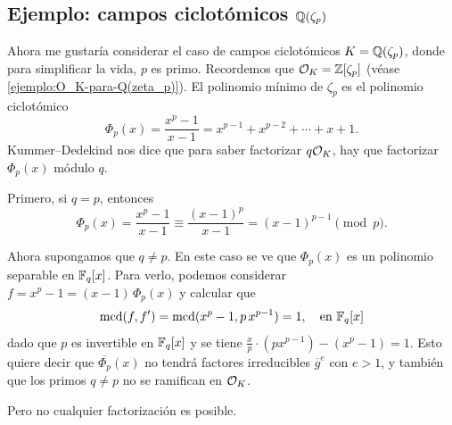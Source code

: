 \subsection{Ejemplo: campos ciclotómicos $\mathbb{Q} (\zeta_p)$}

Ahora me gustaría considerar el caso de campos ciclotómicos $K = \mathbb{Q} (\zeta_p)$,
donde para simplificar la vida, $p$ es primo. Recordemos que
$\mathcal{O}_K = \mathbb{Z} [\zeta_p]$ (véase \ref{ejemplo:O_K-para-Q(zeta_p)}). El polinomio
mínimo de $\zeta_p$ es el polinomio ciclotómico
$$\Phi_p (x) = \frac{x^p - 1}{x-1} = x^{p-1} + x^{p-2} + \cdots + x + 1.$$
Kummer--Dedekind nos dice que para saber factorizar $q\mathcal{O}_K$, hay que
factorizar $\Phi_p (x)$ módulo $q$.

Primero, si $q = p$, entonces
\[ \Phi_p (x) = \frac{x^p - 1}{x-1} \equiv \frac{(x - 1)^p}{x-1} =
   (x-1)^{p-1} \pmod{p}. \]

Ahora supongamos que $q \ne p$. En este caso se ve que $\Phi_p (x)$ es un
polinomio separable en $\mathbb{F}_q [x]$. Para verlo, podemos considerar
$f = x^p - 1 = (x-1)\,\Phi_p (x)$ y calcular que
$$\operatorname{mcd} (f,f') = \operatorname{mcd} (x^p - 1, p\,x^{p-1}) = 1, \quad \text{en }\mathbb{F}_q [x]$$
dado que $p$ es invertible en $\mathbb{F}_q [x]$ y se tiene
$\frac{x}{p} \cdot (p x^{p-1}) - (x^p - 1) = 1$. Esto quiere decir que
$\overline{\Phi_p} (x)$ no tendrá factores irreducibles $\overline{g}^e$ con
$e > 1$, y también que los primos $q \ne p$ no se ramifican en $\mathcal{O}_K$.

Pero no cualquier factorización es posible.

